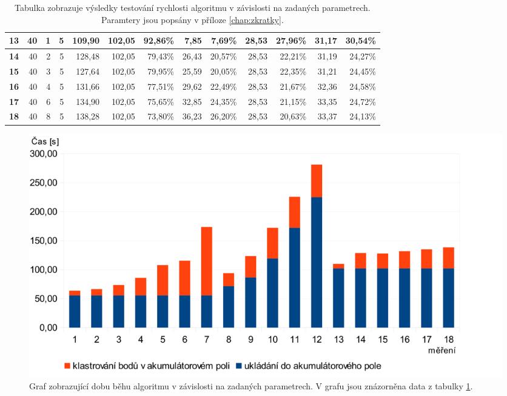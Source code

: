 \documentclass[11pt,twoside,a4paper]{book}
\begin{document}
\begin{table}[ht]
{\begin{tabular}{|r|r|r|r|r|r|r|r|r|r|r|r|r|}
\textbf{13} & 40 & 1 & 5 & 109,90 & 102,05 & 92,86\% & 7,85 & 7,69\% & 28,53 & 27,96\% & 31,17 & 30,54\% \\ \hline
\textbf{14} & 40 & 2 & 5 & 128,48 & 102,05 & 79,43\% & 26,43 & 20,57\% & 28,53 & 22,21\% & 31,19 & 24,27\% \\ \hline
\textbf{15} & 40 & 3 & 5 & 127,64 & 102,05 & 79,95\% & 25,59 & 20,05\% & 28,53 & 22,35\% & 31,21 & 24,45\% \\ \hline
\textbf{16} & 40 & 4 & 5 & 131,66 & 102,05 & 77,51\% & 29,62 & 22,49\% & 28,53 & 21,67\% & 32,36 & 24,58\% \\ \hline
\textbf{17} & 40 & 6 & 5 & 134,90 & 102,05 & 75,65\% & 32,85 & 24,35\% & 28,53 & 21,15\% & 33,35 & 24,72\% \\ \hline
\textbf{18} & 40 & 8 & 5 & 138,28 & 102,05 & 73,80\% & 36,23 & 26,20\% & 28,53 & 20,63\% & 33,37 & 24,13\% \\ \hline
\end{tabular}
}
\caption{Tabulka zobrazuje výsledky testování rychlosti algoritmu v závislosti na zadaných parametrech. Paramtery jsou popsány v příloze \ref{chap:zkratky}.} 
\label{table:test-cas}
\end{table}

\begin{figure}[H]
\begin{center}
\includegraphics[width=\textwidth]{figures/graf-test-cas}
\caption{Graf zobrazující dobu běhu algoritmu v závislosti na zadaných parametrech. V grafu jsou znázorněna data z tabulky \ref{table:test-cas}.}
\label{fig:graf-test-cas}
\end{center}
\end{figure}
\end{document}
